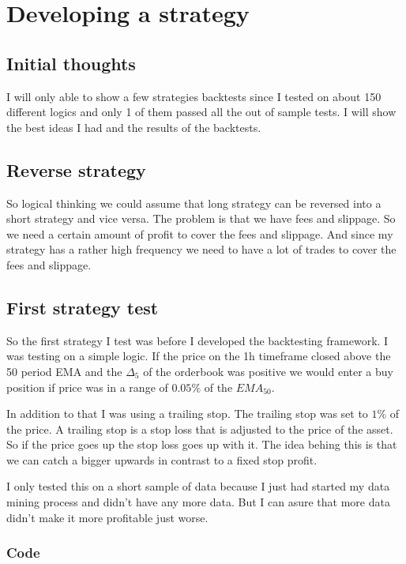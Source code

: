 \documentclass[12pt]{article}
\begin{document}
\newpage
\section{Developing a strategy}

\subsection{Initial thoughts}

I will only able to show a few strategies backtests since I tested on about 150 different logics and only 1 of them passed all the out of sample tests. I will show the best ideas I had and the results of the backtests.


\subsection{Reverse strategy}
So logical thinking we could assume that long strategy can be reversed into a short strategy and vice versa. The problem is that we have fees and slippage. So we need a certain amount of profit to cover the fees and slippage. And since my strategy has a rather high frequency we need to have a lot of trades to cover the fees and slippage.




\subsection{First strategy test}
So the first strategy I test was before I developed the backtesting framework. I was testing on a simple logic. If the price on the 1h timeframe closed above the 50 period EMA and the $\Delta_5$ of the orderbook was positive we would enter a buy position if price was in a range of $0.05\%$ of the $EMA_50$.


In addition to that I was using a trailing stop. The trailing stop was set to $1\%$ of the price.
A trailing stop is a stop loss that is adjusted to the price of the asset. So if the price goes up the stop loss goes up with it. The idea behing this is that we can catch a bigger upwards in contrast to a fixed stop profit.

I only tested this on a short sample of data because I just had started my data mining process and didn't have any more data. But I can asure that more data didn't make it more profitable just worse.


\subsubsection{Code}
\end{document}
